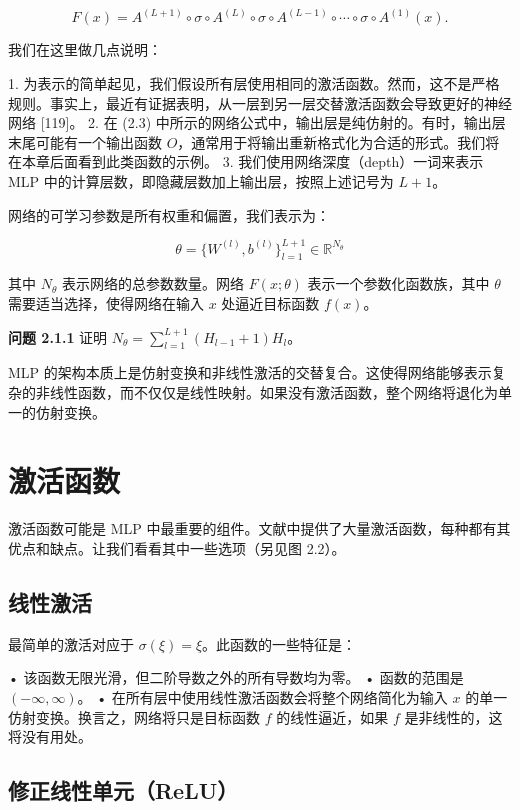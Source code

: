 \[
F(x) = A^{(L+1)} \circ \sigma \circ A^{(L)} \circ \sigma \circ A^{(L-1)} \circ \cdots \circ \sigma \circ A^{(1)}(x).
\]

我们在这里做几点说明：

1. 为表示的简单起见，我们假设所有层使用相同的激活函数。然而，这不是严格规则。事实上，最近有证据表明，从一层到另一层交替激活函数会导致更好的神经网络 [119]。
2. 在 (2.3) 中所示的网络公式中，输出层是纯仿射的。有时，输出层末尾可能有一个输出函数 $O$，通常用于将输出重新格式化为合适的形式。我们将在本章后面看到此类函数的示例。
3. 我们使用网络深度（depth）一词来表示 MLP 中的计算层数，即隐藏层数加上输出层，按照上述记号为 $L+1$。

网络的可学习参数是所有权重和偏置，我们表示为：

\[
\theta = \{ W^{(l)}, b^{(l)} \}_{l=1}^{L+1} \in \mathbb{R}^{N_\theta}
\]

其中 $N_\theta$ 表示网络的总参数数量。网络 $F(x; \theta)$ 表示一个参数化函数族，其中 $\theta$ 需要适当选择，使得网络在输入 $x$ 处逼近目标函数 $f(x)$。

\textbf{问题 2.1.1} 证明 $N_\theta = \sum_{l=1}^{L+1} (H_{l-1} + 1) H_l$。

\begin{mycomment}
MLP 的架构本质上是仿射变换和非线性激活的交替复合。这使得网络能够表示复杂的非线性函数，而不仅仅是线性映射。如果没有激活函数，整个网络将退化为单一的仿射变换。
\end{mycomment}

\section{激活函数}

激活函数可能是 MLP 中最重要的组件。文献中提供了大量激活函数，每种都有其优点和缺点。让我们看看其中一些选项（另见图 2.2）。

\subsection{线性激活}

最简单的激活对应于 $\sigma(\xi) = \xi$。此函数的一些特征是：

• 该函数无限光滑，但二阶导数之外的所有导数均为零。
• 函数的范围是 $(-\infty, \infty)$。
• 在所有层中使用线性激活函数会将整个网络简化为输入 $x$ 的单一仿射变换。换言之，网络将只是目标函数 $f$ 的线性逼近，如果 $f$ 是非线性的，这将没有用处。

\subsection{修正线性单元（ReLU）}

